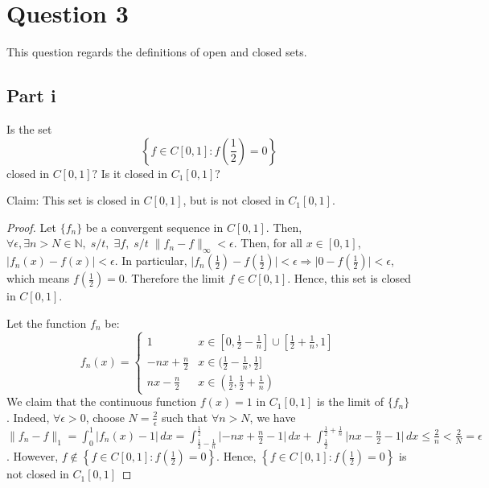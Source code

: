 \section{Question 3}

\begin{question}
    This question regards the definitions of open and closed sets.
\end{question}

\subsection{Part i}

\begin{question}
    Is the set
    $$
    \left\{f \in C[0,1]: f\left(\frac{1}{2}\right)=0\right\}
    $$
    closed in $C[0,1] ?$ Is it closed in $C_1[0,1] ?$
\end{question}

\begin{answer}
    Claim: This set is closed in $C[0,1]$, but is not closed in $C_1[0,1]$.
    \begin{proof}
        Let $\{f_n\}$ be a convergent sequence in $C[0,1]$. Then, $\forall \epsilon, \exists n > N \in \mathbb{N}, \; s/t, \; \exists f, \; s/t \; \lVert f_n - f \lVert_{\infty} < \epsilon$. Then, for all $x \in [0,1]$, $\lvert f_n(x) - f(x) \rvert < \epsilon$. In particular, $\lvert f_n(\tfrac{1}{2}) - f(\tfrac{1}{2}) \rvert < \epsilon \Rightarrow \lvert 0 - f(\tfrac{1}{2}) \rvert < \epsilon$, which means $f(\tfrac{1}{2}) = 0$. Therefore the limit $f \in C[0,1]$. Hence, this set is closed in $C[0,1]$.
        
        Let the function $f_n$ be:
        \begin{equation}
            f_n(x) = 
            \begin{cases}
                1 & x \in [0,\tfrac{1}{2} - \tfrac{1}{n}] \cup [\tfrac{1}{2} + \tfrac{1}{n}, 1]\\
                -nx + \tfrac{n}{2} & x \in (\tfrac{1}{2} - \tfrac{1}{n}, \tfrac{1}{2}]\\
                nx - \tfrac{n}{2} & x \in (\tfrac{1}{2}, \tfrac{1}{2} + \tfrac{1}{n})
            \end{cases}
        \end{equation}
        We claim that the continuous function $f(x) = 1$ in $C_1[0,1]$ is the limit of $\{f_n\}$. Indeed, $\forall \epsilon > 0$, choose $N = \tfrac{2}{\epsilon}$ such that $\forall n > N$, we have $\lVert f_n-f \rVert_1 = \int_0^1 \lvert f_n(x) - 1\rvert \,dx = \int_{\frac{1}{2} - \frac{1}{n}}^{\frac{1}{2}} \lvert -nx + \tfrac{n}{2} - 1 \rvert \,dx + \int_{\frac{1}{2}}^{\frac{1}{2} + \frac{1}{n}} \lvert nx - \tfrac{n}{2} - 1 \rvert \,dx \leq \tfrac{2}{n} < \tfrac{2}{N} = \epsilon$. However, $f \notin \left\{f \in C[0,1]: f\left(\frac{1}{2}\right)=0\right\}$. Hence, $\left\{f \in C[0,1]: f\left(\frac{1}{2}\right)=0\right\}$ is not closed in $C_1[0,1]$
    \end{proof}
\end{answer}

